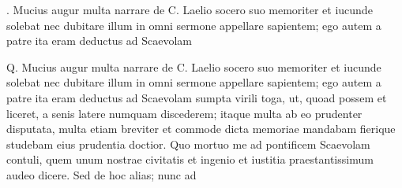 \documentclass[a4paper]{book}
\begin{document}
\beginnumbering
\pstart
. Mucius augur multa narrare de C. Laelio socero suo memoriter et iucunde solebat nec dubitare illum in omni sermone appellare sapientem; ego autem a patre ita eram deductus ad Scaevolam 
\pend
\pausenumbering

\resumenumbering
\numberpstartfalse
    \pstart\noindent Q. Mucius augur multa narrare de C. Laelio socero suo memoriter et iucunde solebat nec dubitare illum in omni sermone appellare sapientem; ego autem a patre ita eram deductus ad Scaevolam sumpta virili toga, ut, quoad possem et liceret, a senis latere numquam discederem; itaque multa ab eo prudenter disputata, multa etiam breviter et commode dicta memoriae mandabam fierique studebam eius prudentia doctior. Quo mortuo me ad pontificem Scaevolam contuli, quem unum nostrae civitatis et ingenio et iustitia praestantissimum audeo dicere. Sed de hoc alias; nunc  ad \pend
\endnumbering
\end{document}
